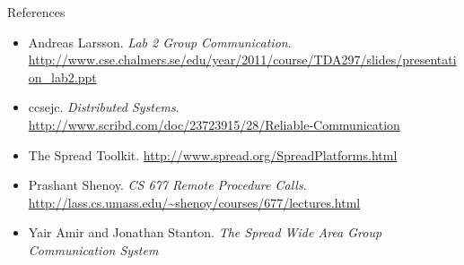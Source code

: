 \documentclass[pdftex]{beamer}
\begin{document}

\begin{frame}{References}

\begin{itemize}
	\item Andreas Larsson. \emph{Lab 2 Group Communication}. \url{http://www.cse.chalmers.se/edu/year/2011/course/TDA297/slides/presentation_lab2.ppt}
	\item ccsejc. \emph{Distributed Systems}. \url{http://www.scribd.com/doc/23723915/28/Reliable-Communication}
	\item The Spread Toolkit. \url{http://www.spread.org/SpreadPlatforms.html}
	\item Prashant Shenoy. \emph{CS 677 Remote Procedure Calls}. \url{http://lass.cs.umass.edu/~shenoy/courses/677/lectures.html}
	\item Yair Amir and Jonathan Stanton. \emph{The Spread Wide Area Group Communication System}
\end{itemize}

\end{frame}
\end{document}
